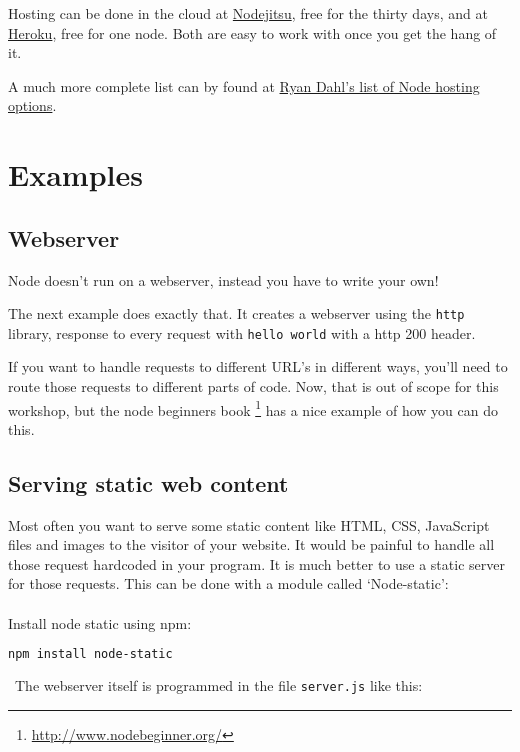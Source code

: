 \documentclass[a4paper]{report}
\begin{document}
Hosting can be done in the cloud at \href{https://www.nodejitsu.com/}{Nodejitsu}, free for the thirty days, and at \href{https://www.heroku.com/}{Heroku}, free for one node. Both are easy to work with once you get the hang of it.

A much more complete list can by found at \href{https://github.com/joyent/node/wiki/Node-Hosting}{Ryan Dahl's list of Node hosting options}.

\section*{Examples}

\subsection*{Webserver}
Node doesn't run on a webserver, instead you have to write your own! 

The next example does exactly that. It creates a webserver using the \texttt{http} library, response to every request with \texttt{hello world} with a http 200 header.



\noindent If you want to handle requests to different URL's in different ways, you'll need to route those requests to different parts of code. Now, that is out of scope for this workshop, but the node beginners book \footnote{\url{http://www.nodebeginner.org/}} has a nice example of how you can do this.

\subsection*{Serving static web content}
Most often you want to serve some static content like HTML, CSS, JavaScript files and images to the visitor of your website. It would be painful to handle all those request hardcoded in your program. It is much better to use a static server for those requests. This can be done with a module called `Node-static':\\
\\
\noindent Install node static using npm:
\begin{lstlisting}[language=bash]
npm install node-static
\end{lstlisting}
\noindent\ The webserver itself is programmed in the file \texttt{server.js} like this:

\end{document}
